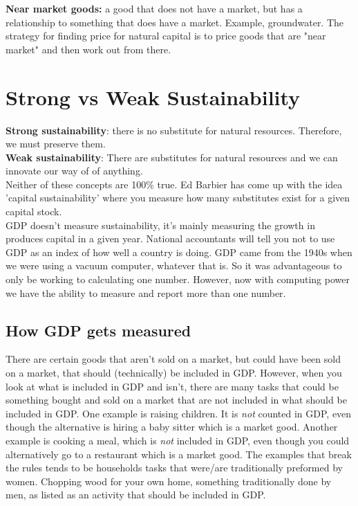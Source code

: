 \documentclass{article}
\begin{document}
\textbf{Near market goods:} a good that does not have a market, but has a relationship to something that does have a market. Example, groundwater. The strategy for finding price for natural capital is to price goods that are "near market" and then work out from there. 

\section{Strong vs Weak Sustainability}
\textbf{Strong sustainability}: there is no substitute for natural resources. Therefore, we must preserve them. \\

\textbf{Weak sustainability}: There are substitutes for natural resources and we can innovate our way of of anything. \\

Neither of these concepts are 100\% true. Ed Barbier has come up with the idea 'capital sustainability' where you measure how many substitutes exist for a given capital stock. \\

GDP doesn't measure sustainability, it's mainly measuring the growth in produces capital in a given year. National accountants will tell you not to use GDP as an index of how well a country is doing. GDP came from the 1940s when we were using a vacuum computer, whatever that is. So it was advantageous to only be working to calculating one number. However, now with computing power we have the ability to measure and report more than one number. 

\subsection{How GDP gets measured}
There are certain goods that aren't sold on a market, but could have been sold on a market, that should (technically) be included in GDP. However, when you look at what is included in GDP and isn't, there are many tasks that could be something bought and sold on a market that are not included in what should be included in GDP. One example is raising children. It is \textit{not} counted in GDP, even though the alternative is hiring a baby sitter which is a market good. Another example is cooking a meal,  which is \textit{not} included in GDP, even though you could alternatively go to a restaurant which is a market good. The examples that break the rules tends to be households tasks that were/are traditionally preformed by women. Chopping wood for your own home, something traditionally done by men, as listed as an activity that should be included in GDP. 
\end{document}

